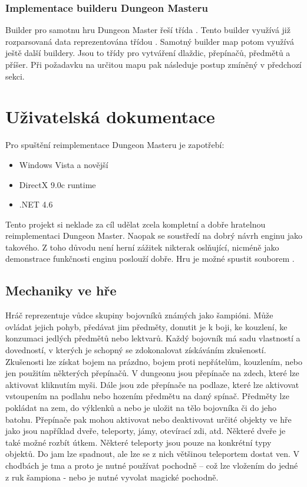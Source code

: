 \subsection{Implementace builderu Dungeon Masteru}
Builder pro samotnu hru Dungeon Master řeší třída . Tento builder
využívá již rozparsovaná data reprezentována třídou .
Samotný builder map potom využívá ještě další buildery. Jsou to třídy pro vytváření
dlaždic, přepínačů, předmětů a příšer. Při požadavku na určitou mapu pak 
následuje postup zmíněný v předchozí sekci.

\chapter{Uživatelská dokumentace}
Pro spuštění reimplementace Dungeon Masteru je zapotřebí:

\begin{itemize}
\item Windows Vista a novější 
\item DirectX 9.0c runtime  
\item .NET 4.6
\end{itemize}

Tento projekt si neklade za cíl udělat zcela kompletní a dobře hratelnou reimplementaci Dungeon Master.
Naopak se soustředí na dobrý návrh enginu jako takového. Z toho důvodu není herní zážitek nikterak
oslňující, nicméně jako demonstrace funkčnosti enginu poslouží dobře.
Hru je možné spustit souborem .

\section{Mechaniky ve hře}
Hráč reprezentuje vůdce skupiny bojovníků známých jako šampióni. Může ovládat jejich pohyb, 
předávat jim předměty, donutit je k boji, ke kouzlení, ke konzumaci jedlých předmětů nebo lektvarů.
Každý bojovník má sadu vlastností a dovedností, v kterých je schopný se zdokonalovat získáváním zkušeností.
Zkušenosti lze získat bojem na prázdno, bojem proti nepřátelům, kouzlením, nebo jen použitím některých přepínačů.
V dungeonu jsou přepínače na zdech, které lze aktivovat kliknutím myši. Dále jsou zde přepínače na 
podlaze, které lze aktivovat vstoupením na podlahu nebo hozením předmětu na daný spínač. Předměty lze
pokládat na zem, do výklenků a nebo je uložit na tělo bojovníka či do jeho batohu. Přepínače pak mohou 
aktivovat nebo deaktivovat určité objekty ve hře jako jsou například dveře, teleporty, jámy, otevírací
zdi, atd. Některé dveře je také možné rozbít útkem. Některé teleporty jsou pouze na konkrétní typy objektů.
Do jam lze spadnout, ale lze se z nich většinou teleportem dostat ven. V chodbách je tma a proto je nutné 
používat pochodně -- což lze vložením do jedné z ruk šampiona - nebo je nutné vyvolat magické pochodně.

